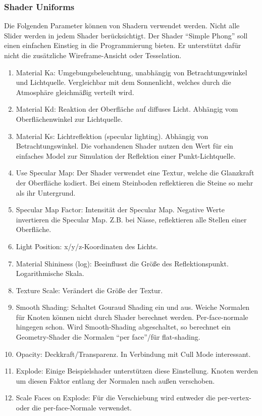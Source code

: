 \documentclass[a4paper,12pt]{article}
\begin{document}
\subsubsection{Shader Uniforms}
Die Folgenden Parameter können von Shadern verwendet werden. Nicht alle Slider werden in jedem Shader berücksichtigt. Der Shader "`Simple Phong"' soll einen einfachen Einstieg in die Programmierung bieten. Er unterstützt dafür nicht die zusätzliche Wireframe-Ansicht oder Tesselation.
\begin{enumerate}
\item Material Ka: Umgebungsbeleuchtung, unabhängig von Betrachtungswinkel und Lichtquelle. Vergleichbar mit dem Sonnenlicht, welches durch die Atmosphäre gleichmäßig verteilt wird.
\item Material Kd: Reaktion der Oberfläche auf diffuses Licht. Abhängig vom Oberflächenwinkel zur Lichtquelle.
\item Material Ks: Lichtreflektion (specular lighting). Abhängig von Betrachtungswinkel. Die vorhandenen Shader nutzen den Wert für ein einfaches Model zur Simulation der Reflektion einer Punkt-Lichtquelle.
\item Use Specular Map: Der Shader verwendet eine Textur, welche die Glanzkraft der Oberfläche kodiert. Bei einem Steinboden reflektieren die Steine so mehr als ihr Untergrund.
\item Specular Map Factor: Intensität der Specular Map. Negative Werte invertieren die Specular Map. Z.B. bei Nässe, reflektieren alle Stellen einer Oberfläche.
\item Light Position: x/y/z-Koordinaten des Lichts.
\item Material Shininess (log): Beeinflusst die Größe des Reflektionspunkt. Logarithmische Skala.
\item Texture Scale: Verändert die Größe der Textur.
\item Smooth Shading: Schaltet Gouraud Shading ein und aus. Weiche Normalen für Knoten können nicht durch Shader berechnet werden. Per-face-normale hingegen schon. Wird Smooth-Shading abgeschaltet, so berechnet ein Geometry-Shader die Normalen "`per face"'/für flat-shading. 
\item Opacity: Deckkraft/Transparenz. In Verbindung mit Cull Mode interessant.
\item Explode: Einige Beispielshader unterstützen diese Einstellung. Knoten werden um diesen Faktor entlang der Normalen nach außen verschoben.
\item Scale Faces on Explode: Für die Verschiebung wird entweder die per-vertex- oder die per-face-Normale verwendet.

\end{enumerate}
\end{document}
